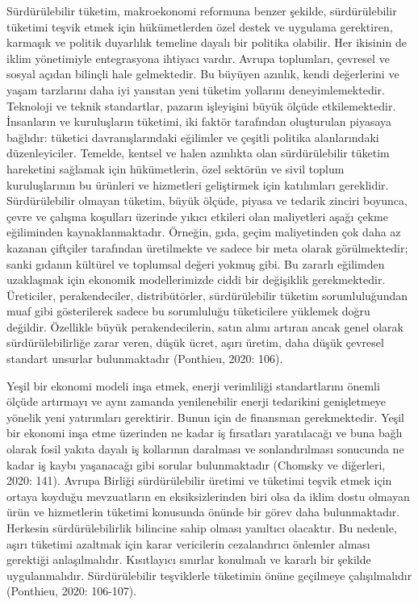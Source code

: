\documentclass[
]{book}
\begin{document}
Sürdürülebilir tüketim, makroekonomi reformuna benzer şekilde, sürdürülebilir tüketimi teşvik etmek için hükümetlerden özel destek ve uygulama gerektiren, karmaşık ve politik duyarlılık temeline dayalı bir politika olabilir. Her ikisinin de iklim yönetimiyle entegrasyona ihtiyacı vardır. Avrupa toplumları, çevresel ve sosyal açıdan bilinçli hale gelmektedir. Bu büyüyen azınlık, kendi değerlerini ve yaşam tarzlarını daha iyi yansıtan yeni tüketim yollarını deneyimlemektedir. Teknoloji ve teknik standartlar, pazarın işleyişini büyük ölçüde etkilemektedir. İnsanların ve kuruluşların tüketimi, iki faktör tarafından oluşturulan piyasaya bağlıdır: tüketici davranışlarındaki eğilimler ve çeşitli politika alanlarındaki düzenleyiciler. Temelde, kentsel ve halen azınlıkta olan sürdürülebilir tüketim hareketini sağlamak için hükümetlerin, özel sektörün ve sivil toplum kuruluşlarının bu ürünleri ve hizmetleri geliştirmek için katılımları gereklidir. Sürdürülebilir olmayan tüketim, büyük ölçüde, piyasa ve tedarik zinciri boyunca, çevre ve çalışma koşulları üzerinde yıkıcı etkileri olan maliyetleri aşağı çekme eğiliminden kaynaklanmaktadır. Örneğin, gıda, geçim maliyetinden çok daha az kazanan çiftçiler tarafından üretilmekte ve sadece bir meta olarak görülmektedir; sanki gıdanın kültürel ve toplumsal değeri yokmuş gibi. Bu zararlı eğilimden uzaklaşmak için ekonomik modellerimizde ciddi bir değişiklik gerekmektedir. Üreticiler, perakendeciler, distribütörler, sürdürülebilir tüketim sorumluluğundan muaf gibi gösterilerek sadece bu sorumluluğu tüketicilere yüklemek doğru değildir. Özellikle büyük perakendecilerin, satın alımı artıran ancak genel olarak sürdürülebilirliğe zarar veren, düşük ücret, aşırı üretim, daha düşük çevresel standart unsurlar bulunmaktadır (Ponthieu, 2020: 106).

Yeşil bir ekonomi modeli inşa etmek, enerji verimliliği standartlarını önemli ölçüde artırmayı ve aynı zamanda yenilenebilir enerji tedarikini genişletmeye yönelik yeni yatırımları gerektirir. Bunun için de finansman gerekmektedir. Yeşil bir ekonomi inşa etme üzerinden ne kadar iş fırsatları yaratılacağı ve buna bağlı olarak fosil yakıta dayalı iş kollarının daralması ve sonlandırılması sonucunda ne kadar iş kaybı yaşanacağı gibi sorular bulunmaktadır (Chomsky ve diğerleri, 2020: 141).
Avrupa Birliği sürdürülebilir üretimi ve tüketimi teşvik etmek için ortaya koyduğu mevzuatların en eksiksizlerinden biri olsa da iklim dostu olmayan ürün ve hizmetlerin tüketimi konusunda önünde bir görev daha bulunmaktadır. Herkesin sürdürülebilirlik bilincine sahip olması yanıltıcı olacaktır. Bu nedenle, aşırı tüketimi azaltmak için karar vericilerin cezalandırıcı önlemler alması gerektiği anlaşılmalıdır. Kısıtlayıcı sınırlar konulmalı ve kararlı bir şekilde uygulanmalıdır. Sürdürülebilir teşviklerle tüketimin önüne geçilmeye çalışılmalıdır (Ponthieu, 2020: 106-107).
\end{document}
